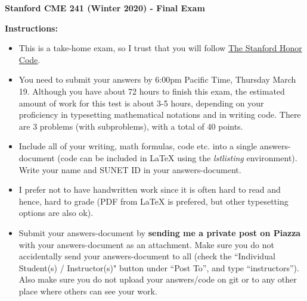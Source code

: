 \documentclass[12pt]{exam}
\begin{document}
\begin{center}
{\large {\bf Stanford CME 241 (Winter 2020) - Final Exam}}
\end{center}
{\large{\bf Instructions:}}
\begin{itemize}
\item This is a take-home exam, so I trust that you will follow \href{https://communitystandards.stanford.edu/policies-and-guidance/honor-code}{The Stanford Honor Code}.
\item You need to submit your answers by 6:00pm Pacific Time, Thursday March 19. Although you have about 72 hours to finish this exam, the estimated amount of work for this test is about 3-5 hours, depending on your proficiency in typesetting mathematical notations and in writing code. There are 3 problems (with subproblems), with a total of 40 points.
\item Include all of your writing, math formulas, code etc. into a single answers-document (code can be included in LaTeX using the {\em lstlisting} environment). Write your name and SUNET ID in your answers-document.
\item I prefer not to have handwritten work since it is often hard to read and hence, hard to grade (PDF from LaTeX is prefered, but other typesetting options are also ok).
\item Submit your answers-document by {\bf sending me a private post on Piazza} with your answers-document as an attachment. Make sure you do not accidentally send your answers-document to all (check the ``Individual Student(s) / Instructor(s)" button under ``Post To'', and type ``instructors''). Also make sure you do not upload your answers/code on git or to any other place where others can see your work.
\end{itemize}

\vspace{10mm}
 
\end{document}
